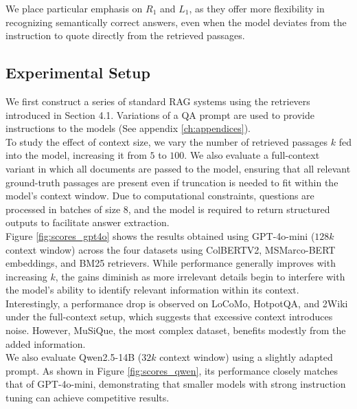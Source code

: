 \noindent We place particular emphasis on $R_1$ and $L_1$, as they offer more flexibility in recognizing semantically correct answers, even when the model deviates from the instruction to quote directly from the retrieved passages.\\

\subsection{Experimental Setup}

\noindent We first construct a series of standard RAG systems using  the retrievers introduced in Section 4.1. Variations of a QA prompt are used to provide instructions to the models (See appendix \ref{ch:appendices}). \\

\noindent To study the effect of context size, we vary the number of retrieved passages $k$ fed into the model, increasing it from $5$ to $100$. We also evaluate a full-context variant in which all documents are passed to the model, ensuring that all relevant ground-truth passages are present even if truncation is needed to fit within the model's context window. Due to computational constraints, questions are processed in batches of size $8$, and the model is required to return structured outputs to facilitate answer extraction.\\

\noindent Figure \ref{fig:scores_gpt4o} shows the results obtained using GPT-4o-mini ($128k$ context window) across the four datasets using ColBERTV2, MSMarco-BERT embeddings, and BM25 retrievers. While performance generally improves with increasing $k$, the gains diminish as more irrelevant details begin to interfere with the model's ability to identify relevant information within its context.\\

\noindent Interestingly, a performance drop is observed on LoCoMo, HotpotQA, and 2Wiki under the full-context setup, which suggests that excessive context introduces noise. However, MuSiQue, the most complex dataset, benefits modestly from the added information.\\




\noindent We also evaluate Qwen2.5-14B ($32k$ context window) using a slightly adapted prompt.  As shown in Figure \ref{fig:scores_qwen}, its performance closely matches that of GPT-4o-mini, demonstrating that smaller models with strong instruction tuning can achieve competitive results. \\

